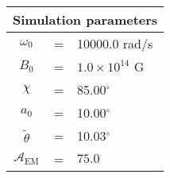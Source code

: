 \begin{tabular}{ccl}
\multicolumn{3}{c}{Simulation parameters} \\
\hline
$\omega_0$  &=& 10000.0 rad/s\\
$B_0$  &=& ${1.0}{\times} 10^{14}$ G \\
$\chi$  &=& 85.00$^{\circ}$ \\
$a_0$ &=& 10.00$^{\circ}$ \\
$\tilde{\theta}$ &= & 10.03$^{\circ}$ \\
$\mathcal{A}_{\mathrm{EM}}$ &= & $75.0$
\end{tabular}